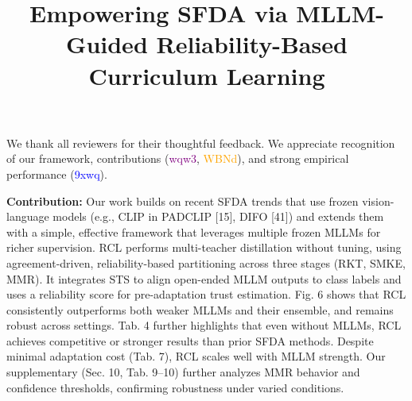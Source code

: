 \documentclass[10pt,twocolumn,letterpaper]{article}
\begin{document}
\title{
\vspace{-0.2cm}
Empowering SFDA via MLLM-Guided Reliability-Based Curriculum Learning
\vspace{-0.2cm}
}  %

\maketitle
\thispagestyle{empty}
\appendix


\noindent 
 We thank all reviewers for their thoughtful feedback. We appreciate recognition of our framework, contributions (\textcolor{purple}{wqw3}, \textcolor{orange}{WBNd}), and strong empirical performance (\textcolor{blue}{9xwq}).

\textbf{Contribution: }
Our work builds on recent SFDA trends that use frozen vision-language models (e.g., CLIP in PADCLIP [15], DIFO [41]) and extends them with a simple, effective framework that leverages multiple frozen MLLMs for richer supervision. RCL performs multi-teacher distillation without tuning, using agreement-driven, reliability-based partitioning across three stages (RKT, SMKE, MMR). It integrates STS to align open-ended MLLM outputs to class labels and uses a reliability score for pre-adaptation trust estimation. Fig. 6 shows that RCL consistently outperforms both weaker MLLMs and their ensemble, and remains robust across settings. Tab. 4 further highlights that even without MLLMs, RCL achieves competitive or stronger results than prior SFDA methods. Despite minimal adaptation cost (Tab. 7), RCL scales well with MLLM strength. Our supplementary (Sec. 10, Tab. 9–10) further analyzes MMR behavior and confidence thresholds, confirming robustness under varied conditions.

\end{document}
